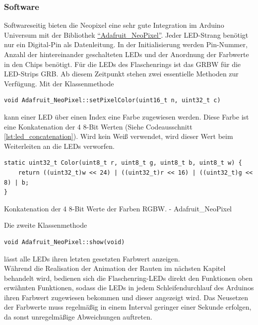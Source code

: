             
        \subsubsection{Software}

            Softwareseitig bieten die Neopixel eine sehr gute Integration im Arduino Universum mit der Bibliothek \href{https://github.com/adafruit/Adafruit_NeoPixel}{\enquote{Adafruit\_NeoPixel}}.
            Jeder LED-Strang benötigt nur ein Digital-Pin als Datenleitung.
            In der Initialisierung werden Pin-Nummer, Anzahl der hintereinander geschalteten LEDs und der Anordnung der Farbwerte in den Chips benötigt. Für die LEDs des Flaschenrings ist das GRBW für die LED-Strips GRB.
            Ab diesem Zeitpunkt stehen zwei essentielle Methoden zur Verfügung.
            Mit der Klassenmethode 

            \begin{verbatim}
void Adafruit_NeoPixel::setPixelColor(uint16_t n, uint32_t c)
            \end{verbatim}

            kann einer LED über einen Index eine Farbe zugewiesen werden.
            Diese Farbe ist eine Konkatenation der 4 8-Bit Werten (Siehe Codeausschnitt\,\ref{lst:led_concatenation}).
            Wird kein Weiß verwendet, wird dieser Wert beim Weiterleiten an die LEDs verworfen.

            \begin{listing}
                \begin{verbatim}
static uint32_t Color(uint8_t r, uint8_t g, uint8_t b, uint8_t w) {
    return ((uint32_t)w << 24) | ((uint32_t)r << 16) | ((uint32_t)g << 8) | b;
}
                \end{verbatim}
                \caption{Konkatenation der 4 8-Bit Werte der Farben RGBW. - Adafruit\_NeoPixel}
                \label{lst:led_concatenation}
            \end{listing}

            Die zweite Klassenmethode

            \begin{verbatim}
void Adafruit_NeoPixel::show(void)
            \end{verbatim}

            lässt alle LEDs ihren letzten gesetzten Farbwert anzeigen.\\

            Während die Realisation der Animation der Rauten im nächsten Kapitel behandelt wird, bedienen sich die Flaschenring-LEDs direkt den Funktionen oben erwähnten Funktionen, sodass die LEDs in jedem Schleifendurchlauf des Arduinos ihren Farbwert zugewiesen bekommen und dieser angezeigt wird.
            Das Neusetzen der Farbwerte muss regelmäßig in einem Interval geringer einer Sekunde erfolgen, da sonst unregelmäßige Abweichungen auftreten.


